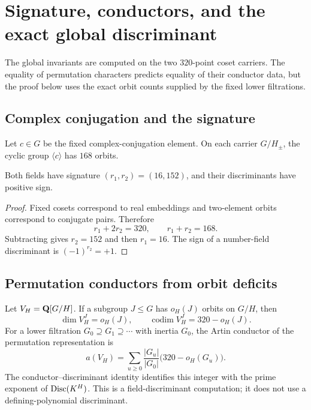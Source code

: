 \section{Signature, conductors, and the exact global discriminant}
\label{sec:global}

The global invariants are computed on the two $320$-point coset carriers.
The equality of permutation characters predicts equality of their conductor
data, but the proof below uses the exact orbit counts supplied by the fixed
lower filtrations.

\subsection{Complex conjugation and the signature}

Let $c\in G$ be the fixed complex-conjugation element.  On each carrier
$G/H_\pm$, the cyclic group $\langle c\rangle$ has $168$ orbits.

\begin{lemma}[Signature]
\label{lem:signature}
Both fields have signature $(r_1,r_2)=(16,152)$, and their discriminants
have positive sign.
\end{lemma}

\begin{proof}
Fixed cosets correspond to real embeddings and two-element orbits correspond
to conjugate pairs.  Therefore
\[
 r_1+2r_2=320,
 \qquad
 r_1+r_2=168.
\]
Subtracting gives $r_2=152$ and then $r_1=16$.  The sign of a number-field
discriminant is $(-1)^{r_2}=+1$.
\end{proof}

\subsection{Permutation conductors from orbit deficits}

Let $V_H=\mathbf{Q}[G/H]$.  If a subgroup $J\leq G$ has $o_H(J)$ orbits on
$G/H$, then
\begin{equation}
 \dim V_H^J=o_H(J),
 \qquad
 \operatorname{codim}V_H^J=320-o_H(J).
 \label{eq:orbit-codim}
\end{equation}
For a lower filtration $G_0\supseteq G_1\supseteq\cdots$ with inertia
$G_0$, the Artin conductor of the permutation representation is
\begin{equation}
 a(V_H)=\sum_{u\geq0}\frac{|G_u|}{|G_0|}
       \bigl(320-o_H(G_u)\bigr).
 \label{eq:permutation-conductor}
\end{equation}
The conductor--discriminant identity identifies this integer with the prime
exponent of $\operatorname{Disc}(K^H)$.  This is a field-discriminant computation; it does
not use a defining-polynomial discriminant.


